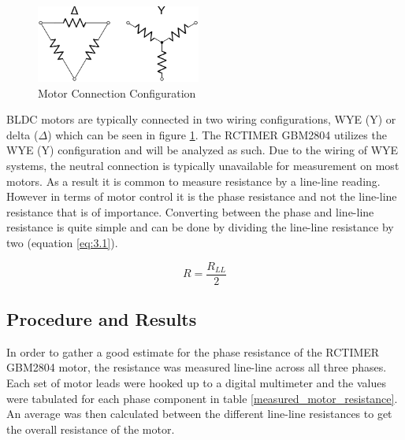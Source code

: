 \begin{figure}[H]%
	\begin{center}
		\includegraphics[height=1in]{figures/motor_winding.png}
		
		\caption[Motor Connection Configuration]{Motor Connection Configuration}
		
		\label{motor_configuration}
	\end{center}
\end{figure}

BLDC motors are typically connected in two wiring configurations, WYE (Y) or delta (\(\Delta \)) which can be seen in figure \ref{motor_configuration}. The RCTIMER GBM2804 utilizes the WYE (Y) configuration and will be analyzed as such. Due to the wiring of WYE systems, the neutral connection is typically unavailable for measurement on most motors. As a result it is common to measure resistance by a line-line reading. However in terms of motor control it is the phase resistance and not the line-line resistance that is of importance. Converting between the phase and line-line resistance is quite simple and can be done by dividing the line-line resistance by two (equation \ref{eq:3.1}).

\begin{equation} \label{eq:3.1}
R = \frac{R_{LL}}{2}
\end{equation}

\subsection{Procedure and Results}

In order to gather a good estimate for the phase resistance of the RCTIMER GBM2804 motor, the resistance was measured line-line across all three phases. Each set of motor leads were hooked up to a digital multimeter and the values were tabulated for each phase component in table \ref{measured_motor_resistance}. An average was then calculated between the different line-line resistances to get the overall resistance of the motor.

